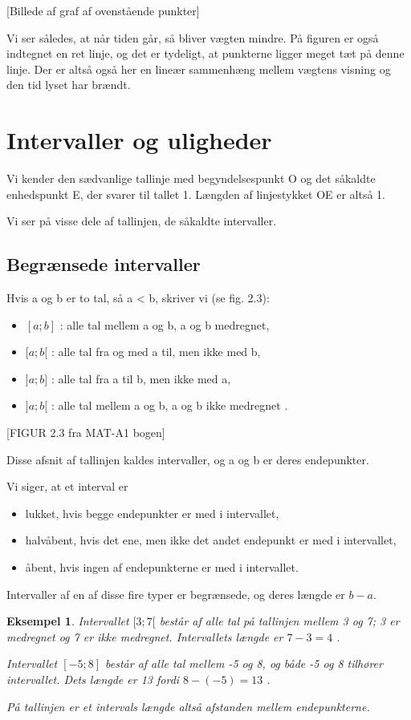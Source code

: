 \documentclass[12pt,oneside,a4paper]{article}
\newtheorem{eks}[thm]{Eksempel}
\begin{document}
[Billede af graf af ovenstående punkter]

Vi ser således, at når tiden går, så bliver vægten mindre.
På figuren er også indtegnet en ret linje, og det er tydeligt, at punkterne
ligger meget tæt på denne linje.  Der er altså også her en lineær sammenhæng
mellem vægtens visning og den tid lyset har brændt.

\section{Intervaller og uligheder}

Vi kender den sædvanlige tallinje med begyndelsespunkt O og det såkaldte
enhedspunkt E, der svarer til tallet 1. Længden af linjestykket OE er altså 1.

Vi ser på visse dele af tallinjen, de såkaldte intervaller.

\subsection{Begrænsede intervaller}
Hvis a og b er to tal, så a < b, skriver vi (se fig. 2.3):
\begin{itemize}
    \item $[a;b]$ : alle tal mellem a og b, a og b medregnet,
    \item $[a;b[$ : alle tal fra og med a til, men ikke med b,
    \item $]a;b]$ : alle tal fra a til b, men ikke med a,
    \item $]a;b[$ : alle tal mellem a og b, a og b ikke medregnet .
\end{itemize}

[FIGUR 2.3 fra MAT-A1 bogen]

Disse afsnit af tallinjen kaldes intervaller, og a og b er deres endepunkter.

Vi siger, at et interval er
\begin{itemize}
    \item lukket, hvis begge endepunkter er med i intervallet,
    \item halvåbent, hvis det ene, men ikke det andet endepunkt er med i intervallet,
    \item åbent, hvis ingen af endepunkterne er med i intervallet.
\end{itemize}
Intervaller af en af disse fire typer er begrænsede, og deres længde er $b-a$.

\begin{eks}
Intervallet $[3;7[$ består af alle tal på tallinjen mellem 3 og 7; 3 er
medregnet og 7 er ikke medregnet. Intervallets længde er $7-3 = 4$ .

Intervallet $[-5;8]$ består af alle tal mellem -5 og 8, og både -5 og 8
tilhører intervallet. Dets længde er 13 fordi $8 - (-5) = 13$ .

På tallinjen er et intervals længde altså afstanden mellem endepunkterne.
\end{eks}
\end{document}
